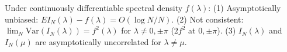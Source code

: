 Under continuously differentiable spectral density $f(\lambda)$:
(1) Asymptotically unbiased: $E I_N(\lambda) - f(\lambda) = O(\log N / N)$.
(2) Not consistent: $\lim_N \mathrm{Var}(I_N(\lambda)) = f^2(\lambda)$ for $\lambda \neq 0, \pm\pi$ ($2f^2$ at $0, \pm\pi$).
(3) $I_N(\lambda)$ and $I_N(\mu)$ are asymptotically uncorrelated for $\lambda \neq \mu$.
